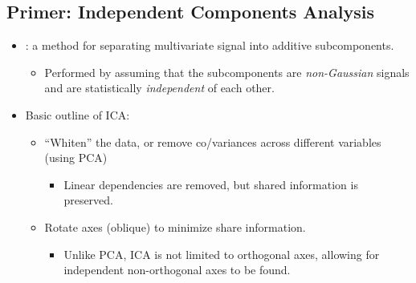 \begin{itemize}
  \subsection{Primer: Independent Components Analysis}
  \begin{itemize}
    \item {}: a method for separating multivariate signal into additive subcomponents.
      \begin{itemize}
        \item Performed by assuming that the subcomponents are \emph{non-Gaussian} signals and are statistically \emph{independent} of each other.
      \end{itemize}
    \item Basic outline of ICA\@:
    \begin{itemize}
      \item ``Whiten'' the data, or remove co/variances across different variables (using PCA)
        \begin{itemize}
          \item Linear dependencies are removed, but shared information is preserved.
        \end{itemize}
      \item Rotate axes (oblique) to minimize share information.
        \begin{itemize}
          \item Unlike PCA, ICA is not limited to orthogonal axes, allowing for independent non-orthogonal axes to be found.
        \end{itemize}
     \end{itemize}
  \end{itemize}
    
\end{itemize}

